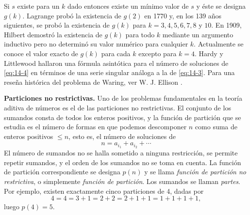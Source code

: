    Si $s$ existe para un $k$ dado entonces existe un mínimo valor de $s$ y éste se designa
    $g(k)$. Lagrange probó la existencia de $g(2)$ en 1770 y, en los 139 años siguientes, se
    probó la existencia de $g(k)$ para $k=3,4,5,6,7,8$ y $10$. En 1909, Hilbert demostró la
    existencia de $g(k)$ para todo $k$ mediante un argumento inductivo pero no determinó su
    valor numérico para cualquier $k$. Actualmente se conoce el valor exacto de $g(k)$ para
    cada $k$ excepto para $k=4$. Hardy y Littlewood hallaron una fórmula asintótica para el
    número de soluciones de \eqref{eq:14-4} en términos de una serie singular análoga a la de
    \eqref{eq:14-3}. Para una reseña histórica del problema de Waring, ver W. J. Ellison
    \cite{ellison1971}.

    \textbf{Particiones no restrictivas.} Uno de los problemas fundamentales en la teoría
    aditiva de números es el de las particiones no restrictivas. El conjunto de los sumandos
    consta de todos los enteros positivos, y la función de partición que se estudia es el número
    de formas en que podemos descomponer $n$ como suma de enteros positivos $\leq n$, esto es,
    el número de soluciones de
    \begin{equation}\label{eq:14-5}
        n=a_{i_1}+a_{i_2}+\cdots
    \end{equation}
    El número de sumandos no se halla sometido a ninguna restricción, se permite repetir
    sumandos, y el orden de los sumandos no se toma en cuenta. La función de partición
    correspondiente se designa $p(n)$ y se llama \textit{función de partición no restrictiva},
    o simplemente \textit{función de partición}. Los sumandos se llaman \textit{partes}. Por
    ejemplo, existen exactamente cinco particiones de 4, dadas por
    \begin{equation*}
        4=4=3+1=2+2=2+1+1=1+1+1+1,
    \end{equation*}
    luego $p(4)=5$.

